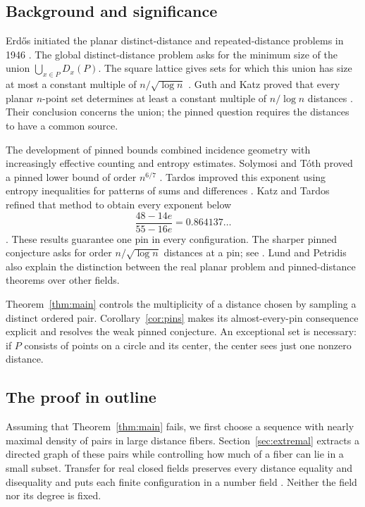 \subsection{Background and significance}
Erd\H{o}s initiated the planar distinct-distance and repeated-distance
problems in 1946 \cite{Erdos1946}. The global distinct-distance problem
asks for the minimum size of the union $\bigcup_{x\in P}D_x(P)$.
The square lattice gives sets for which this union has size at most a
constant multiple of $n/\sqrt{\log n}$ \cite[Theorem~1]{Erdos1946}.
Guth and Katz proved that every planar $n$-point
set determines at least a constant multiple of $n/\log n$ distances
\cite[Theorem~1.1]{GuthKatz}. Their conclusion concerns the union;
the pinned question requires the distances to have a common source.

The development of pinned bounds combined incidence geometry with
increasingly effective counting and entropy estimates. Solymosi and
T\'oth proved a pinned lower bound of order $n^{6/7}$
\cite[Theorem~1]{SolymosiToth}. Tardos improved this exponent using
entropy inequalities for patterns of sums and differences
\cite{Tardos2003}. Katz and Tardos refined that method to obtain every
exponent below
\[
 \frac{48-14e}{55-16e}=0.864137\ldots
\]
\cite{KatzTardos}. These results guarantee one pin in every
configuration. The sharper pinned conjecture asks for order
$n/\sqrt{\log n}$ distances at a pin; see
\cite[Introduction]{LundPetridis}. Lund and Petridis also explain the
distinction between the real planar problem and pinned-distance
theorems over other fields.

Theorem~\ref{thm:main} controls the multiplicity of a distance chosen
by sampling a distinct ordered pair. Corollary~\ref{cor:pins} makes
its almost-every-pin consequence explicit and resolves the weak
pinned conjecture. An exceptional set is necessary: if $P$ consists of
points on a circle and its center, the center sees just one nonzero distance.

\subsection{The proof in outline}
Assuming that Theorem~\ref{thm:main} fails, we first choose a sequence
with nearly maximal density of pairs in large distance fibers.
Section~\ref{sec:extremal} extracts a directed graph of these pairs
while controlling how much of a fiber can lie in a small subset.
Transfer for real closed fields preserves every distance equality and
disequality and puts each finite configuration in a number field
\cite[Theorems~3.1 and~4.1]{RCFTransfer}. Neither the field nor its
degree is fixed.

